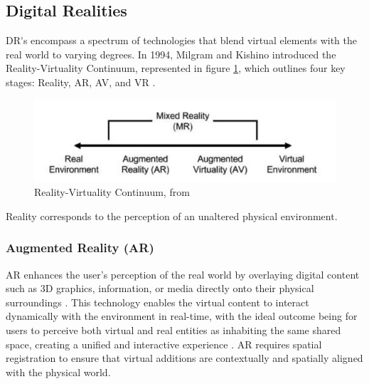 
\subsection{Digital Realities} 

\ac{DR's} encompass a spectrum of technologies that blend virtual elements with the real world to varying degrees. 
In 1994, Milgram and Kishino introduced the Reality-Virtuality Continuum, represented in figure \ref{f:real-virtual-continuum}, which outlines four key stages: Reality, \ac{AR}, \ac{AV}, and \ac{VR} \cite{milgram1994}.

\begin{figure}[h]
    \centering
    \includegraphics[width=0.6\linewidth]{figs/mixed-reality-continuum.jpg}
    \caption{Reality-Virtuality Continuum, from \cite{milgram1994}}
    \label{f:real-virtual-continuum}
\end{figure}

Reality corresponds to the perception of an unaltered physical environment.

\subsubsection{Augmented Reality (\ac{AR})}
    \ac{AR} enhances the user's perception of the real world by overlaying digital content such as 3D graphics, information, or media directly 
    onto their physical surroundings \cite{liu2022digitaltwin}. 
    This technology enables the virtual content to interact dynamically with the environment in real-time, with the ideal outcome being for users
    to perceive both virtual and real entities as inhabiting the same shared space, creating a unified and interactive experience \cite{Azuma1997}.
    \ac{AR} requires spatial registration to ensure that virtual additions are contextually and spatially aligned with the physical world.

